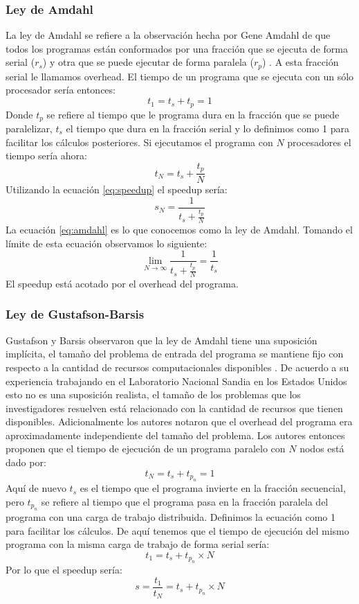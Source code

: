 \subsubsection{Ley de Amdahl}
La ley de Amdahl se refiere a la observación hecha por Gene Amdahl de que todos los programas están conformados por una fracción que se ejecuta de forma serial ($r_s$) y otra que se puede ejecutar de forma paralela ($r_p$) \cite{amdahl1967}. A esta fracción serial le llamamos overhead. El tiempo de un programa que se ejecuta con un sólo procesador sería entonces:
$$t_1 = t_s + t_p = 1$$
Donde $t_p$ se refiere al tiempo que le programa dura en la fracción que se puede paralelizar, $t_s$ el tiempo que dura en la fracción serial y lo definimos como 1 para facilitar los cálculos posteriores.
Si ejecutamos el programa con $N$ procesadores el tiempo sería ahora:
$$t_N = t_s + \frac{t_p}{N}$$
Utilizando la ecuación \ref{eq:speedup} el speedup sería:
\begin{equation}
s_N = \frac{1}{t_s + \frac{t_p}{N}}
 \label{eq:amdahl} 
\end{equation}
La ecuación \ref{eq:amdahl} es lo que conocemos como la ley de Amdahl. Tomando el límite de esta ecuación observamos lo siguiente:
$$\lim_{N\to\infty} \frac{1}{t_s + \frac{t_p}{N}} = \frac{1}{t_s}$$
El speedup está acotado por el overhead del programa.
\subsubsection{Ley de Gustafson-Barsis}
Gustafson y Barsis observaron que la ley de Amdahl tiene una suposición implícita, el tamaño del problema de entrada del programa se mantiene fijo con respecto a la cantidad de recursos computacionales disponibles \cite{Gustafson1988}. De acuerdo a su experiencia trabajando en el Laboratorio Nacional Sandia en los Estados Unidos esto no es una suposición realista, el tamaño de los problemas que los investigadores resuelven está relacionado con la cantidad de recursos que tienen disponibles. Adicionalmente los autores notaron que el overhead del programa era aproximadamente independiente del tamaño del problema. Los autores entonces proponen que el tiempo de ejecución de un programa paralelo con $N$ nodos está dado por:
$$t_N = t_s + t_{p_n} = 1$$
Aquí de nuevo $t_s$ es el tiempo que el programa invierte en la fracción secuencial, pero $t_{p_n}$ se refiere al tiempo que el programa pasa en la fracción paralela del programa con una carga de trabajo distribuida. Definimos la ecuación como 1 para facilitar los cálculos.
De aquí tenemos que el tiempo de ejecución del mismo programa con la misma carga de trabajo de forma serial sería:
$$t_1 = t_s + t_{p_n}\times N$$
Por lo que el speedup sería:
\begin{equation}
  s = \frac{t_1}{t_N} = t_s + t_{p_n}\times N
  \label{eq:gustafson}
\end{equation}

